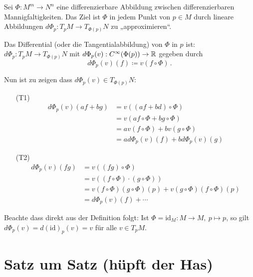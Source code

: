 \documentclass[a4paper,twoside,DIV15,BCOR12mm]{scrbook}
\renewcommand{\da}{\coloneqq}
\begin{document}
Sei $\Phi:M^m\to N^n$ eine differenzierbare Abbildung zwischen differenzierbaren Mannigfaltigkeiten. Das Ziel ist $\Phi$ in jedem Punkt von $p\in M$ durch lineare Abbildungen $d\Phi_p: T_pM \to T_{\Phi(p)}N$ zu „approximieren“. 

\begin{definition}
Das Differential (oder die Tangentialabbildung) von $\Phi$ in $p$ ist:
$ d\Phi_p : T_pM \to T_{\Phi(p)}N $ mit $d\Phi_p(v) : C^\infty(\Phi(p)) \to \mathbb{R}$ gegeben durch
\[ d\Phi_p(v)(f) \da v(f \circ \Phi)\,. \]
\end{definition}

Nun ist zu zeigen dass $d\Phi_p(v) \in T_{\Phi(p)}N$:
\begin{itemize}
\item[(T1)]
\begin{align*}
d\Phi_p(v)(af + bg) 
&= v( (af+bd) \circ \Phi) \\
&=v(af \circ \Phi + bg \circ \Phi) \\
&=a v(f\circ \Phi) + b v(g\circ \Phi) \\
&=a d\Phi_p(v)(f) + b d\Phi_p(v)(g)
\end{align*}
\item[(T2)]
\begin{align*}
d\Phi_p(v)(fg) 
&= v( (fg)\circ \Phi) \\
&= v( (f\circ \Phi)\cdot(g\circ\Phi) ) \\
&= v(f\circ \Phi)(g\circ \Phi)(p) + v(g\circ \Phi)(f\circ \Phi)(p) \\
&= d\Phi_p(v)(f) + \cdots 
\end{align*}
\end{itemize}

Beachte dass direkt aus der Definition folgt: Ist $\Phi = \text{id}_M: M\to M,\> p\mapsto p$, so gilt $d\Phi_p(v) = d(\text{id})_p(v) = v$ für alle $v\in T_pM$.




\appendix
\chapter{Satz um Satz (hüpft der Has)}

\renewcommand{\indexname}{Stichwortverzeichnis}
\addtocounter{chapter}{1}
\printindex
\end{document}
